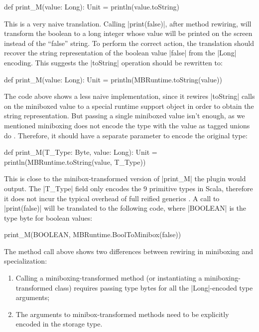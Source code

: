 \begin{lstlisting-nobreak}
 def print_M(value: Long): Unit = println(value.toString)
\end{lstlisting-nobreak}

This is a very naive translation. Calling |print(false)|, after method rewiring, will transform the boolean to a long integer whose value will be printed on the screen instead of the ``false'' string. To perform the correct action, the translation should recover the string representation of the boolean value |false| from the |Long| encoding. This suggests the |toString| operation should be rewritten to: 

\begin{lstlisting-nobreak}
 def print_M(value: Long): Unit = println(MBRuntime.toString(value))
\end{lstlisting-nobreak}

The code above shows a less naive implementation, since it rewires |toString| calls on the miniboxed value to a special runtime support object in order to obtain the string representation. But passing a single miniboxed value isn't enough, as we mentioned miniboxing does not encode the type with the value as tagged unions do \cite{tagged-unions-lua}. Therefore, it should have a separate parameter to encode the original type: 

\begin{lstlisting-nobreak}
 def print_M(T_Type: Byte, value: Long): Unit = println(MBRuntime.toString(value, T_Type))
\end{lstlisting-nobreak}

This is close to the minibox-transformed version of |print_M| the plugin would output. The |T_Type| field only encodes the 9 primitive types in Scala, therefore it does not incur the typical overhead of full reified generics \cite{michel-thesis}. A call to |print(false)| will be translated to the following code, where |BOOLEAN| is the type byte for boolean values:

\begin{lstlisting-nobreak}
 print_M(BOOLEAN, MBRuntime.BoolToMinibox(false))
\end{lstlisting-nobreak}

The method call above shows two differences between rewiring in miniboxing and specialization:
\begin{enumerate}
  \item Calling a miniboxing-transformed method (or instantiating a miniboxing-transformed class) requires passing type bytes for all the |Long|-encoded type arguments;
  \item The arguments to minibox-transformed methods need to be explicitly encoded in the storage type.
\end{enumerate}

